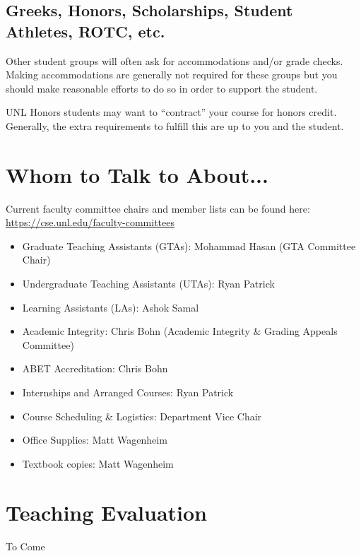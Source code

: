 \documentclass[12pt]{scrartcl}
\begin{document}
\subsection{Greeks, Honors, Scholarships, Student Athletes, ROTC, etc.}

Other student groups will often ask for accommodations and/or
grade checks.  Making accommodations are generally not required
for these groups but you should make reasonable efforts to do so
in order to support the student.  

UNL Honors students may want to ``contract'' your course for honors
credit.  Generally, the extra requirements to fulfill this are up
to you and the student.


\section{Whom to Talk to About...}

Current faculty committee chairs and member lists can be found
here: \url{https://cse.unl.edu/faculty-committees}

\begin{itemize}
  \item Graduate Teaching Assistants (GTAs): Mohammad Hasan (GTA Committee Chair)
  \item Undergraduate Teaching Assistants (UTAs): Ryan Patrick
  \item Learning Assistants (LAs): Ashok Samal
  \item Academic Integrity: Chris Bohn (Academic Integrity \& Grading Appeals Committee)
  \item ABET Accreditation: Chris Bohn
  \item Internships and Arranged Courses: Ryan Patrick
  \item Course Scheduling \& Logistics: Department Vice Chair
  \item Office Supplies: Matt Wagenheim
  \item Textbook copies: Matt Wagenheim
\end{itemize}

\section{Teaching Evaluation}

To Come
\end{document}
